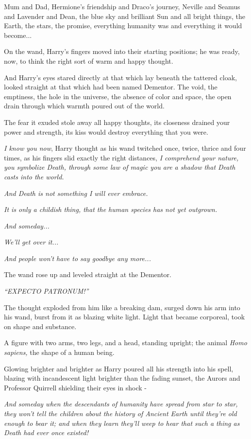 Mum and Dad, Hermione's friendship and Draco's journey, Neville and
Seamus and Lavender and Dean, the blue sky and brilliant Sun and all
bright things, the Earth, the stars, the promise, everything humanity
was and everything it would become...

On the wand, Harry's fingers moved into their starting positions; he was
ready, now, to think the right sort of warm and happy thought.

And Harry's eyes stared directly at that which lay beneath the tattered
cloak, looked straight at that which had been named Dementor. The void,
the emptiness, the hole in the universe, the absence of color and space,
the open drain through which warmth poured out of the world.

The fear it exuded stole away all happy thoughts, its closeness drained
your power and strength, its kiss would destroy everything that you
were.

\emph{I know you now}, Harry thought as his wand twitched once, twice,
thrice and four times, as his fingers slid exactly the right distances,
\emph{I comprehend your nature, you symbolize Death, through some law of
magic you are a shadow that Death casts into the world.}

\emph{And Death is not something I will ever embrace.}

\emph{It is only a childish thing, that the human species has not yet
outgrown.}

\emph{And someday...}

\emph{We'll get over it...}

\emph{And people won't have to say goodbye any more...}

The wand rose up and leveled straight at the Dementor.

\emph{``EXPECTO PATRONUM!''}

The thought exploded from him like a breaking dam, surged down his arm
into his wand, burst from it as blazing white light. Light that became
corporeal, took on shape and substance.

A figure with two arms, two legs, and a head, standing upright; the
animal \emph{Homo sapiens,} the shape of a human being.

Glowing brighter and brighter as Harry poured all his strength into his
spell, blazing with incandescent light brighter than the fading sunset,
the Aurors and Professor Quirrell shielding their eyes in shock -

\emph{And someday when the descendants of humanity have spread from star
to star, they won't tell the children about the history of Ancient Earth
until they're old enough to bear it; and when they learn they'll weep to
hear that such a thing as Death had ever once existed!}

